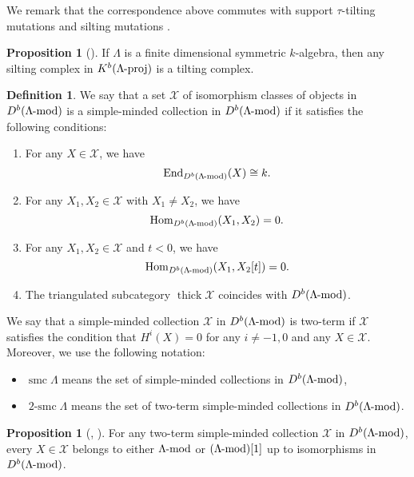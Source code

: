 \documentclass[pdftex,a4paper]{article}
\numberwithin{equation}{subsection}
\theoremstyle{definition}
\newtheorem{proposition}[theorem]{Proposition}
\newtheorem{definition}[theorem]{Definition}
\newcommand{\lmod}{\operatorname{\mathrm{\hspace{-2pt}-mod}}}
\newcommand{\lproj}{\operatorname{\mathrm{\hspace{-2pt}-proj}}}
\newcommand{\thick}{\operatorname{\mathrm{thick}}}
\newcommand{\End}{\operatorname{End}\nolimits}
\newcommand{\Hom}{\operatorname{Hom}\nolimits}
\newcommand{\smc}{\operatorname{\mathrm{smc}}}
\newcommand{\twosmc}{\operatorname{\mathrm{2-smc}}}
\begin{document}
We remark that the correspondence above commutes with support \(\tau\)-tilting mutations and silting mutations \cite[Corollary 3.9]{MR3187626}.

\begin{proposition}[{\cite[Example 2.8]{MR2927802}}]
	If \(\Lambda\) is a finite dimensional symmetric \(k\)-algebra, then any silting complex in \(K^b(\Lambda \lproj)\) is a tilting complex.
\end{proposition}
\begin{definition}
	We say that
	a set \(\mathcal{X}\) of isomorphism classes of objects in \(D^b(\Lambda\lmod)\) is a simple-minded collection in \(D^b(\Lambda\lmod)\) if it satisfies the following conditions:
	\begin{enumerate}
		\item For any \(X \in \mathcal{X}\), we have  \[\End_{D^b(\Lambda\lmod)}(X)\cong k.\]
		\item For any \(X_1, X_2 \in \mathcal{X}\) with \(X_1\neq X_2\), we have \[\Hom_{D^b(\Lambda\lmod)}(X_1, X_2)=0.\]
		\item For any \(X_1, X_2 \in \mathcal{X}\) and \(t <0\), we have \[\Hom_{D^b(\Lambda\lmod)}(X_1,X_2[t])=0.\]
		\item The triangulated subcategory \(\thick \mathcal{X}\) coincides with \(D^b(\Lambda\lmod)\).
	\end{enumerate}
\end{definition}
We say that a simple-minded collection \(\mathcal{X}\) in \(D^b(\Lambda\lmod)\) is two-term if \(\mathcal{X}\) satisfies the condition that \(H^i(X)=0\) for any \(i \neq -1,0\) and any \(X \in \mathcal{X}\).
Moreover, we use the following notation:
\begin{itemize}
	\item \(\smc \Lambda\) means the set of simple-minded collections in \(D^b(\Lambda\lmod)\),
	\item \(\twosmc \Lambda\) means the set of two-term simple-minded collections in \(D^b(\Lambda\lmod)\).
\end{itemize}
\begin{proposition}[{\cite[Remark 4.11]{MR3220536},%
			}]
	For any two-term simple-minded collection \(\mathcal{X}\) in \(D^b(\Lambda\lmod)\),
	every \(X \in \mathcal{X}\) belongs to either \(\Lambda\lmod\) or \((\Lambda\lmod)[1]\) up to isomorphisms in \(D^b(\Lambda\lmod)\).
\end{proposition}
\end{document}
